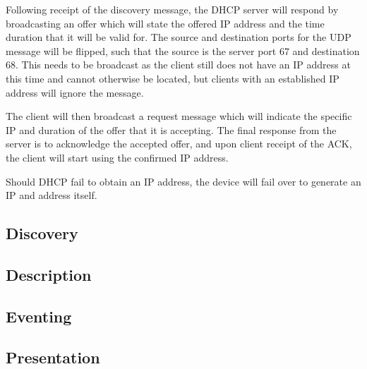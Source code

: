 Following receipt of the discovery message, the DHCP server will respond by broadcasting an offer which will state the offered IP address and the time duration that it will be valid for. The source and destination ports for the UDP message will be flipped, such that the source is the server port 67 and destination 68. This needs to be broadcast as the client still does not have an IP address at this time and cannot otherwise be located, but clients with an established IP address will ignore the message.

The client will then broadcast a request message which will indicate the specific IP and duration of the offer that it is accepting. The final response from the server is to acknowledge the accepted offer, and upon client receipt of the ACK, the client will start using the confirmed IP address.

Should DHCP fail to obtain an IP address, the device will fail over to generate an IP and address itself.

\subsection{Discovery}

\subsection{Description}

\subsection{Eventing}

\subsection{Presentation}